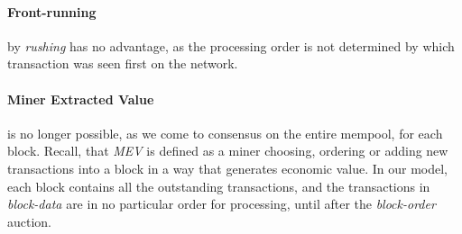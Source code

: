 \documentclass[12pt]{article}
\begin{document}
\paragraph*{Front-running} by \emph{rushing} has no advantage, as the processing order is not determined by which transaction was seen first on the network. 

\paragraph*{Miner Extracted Value} is no longer possible, as we come to consensus on the entire mempool, for each block. Recall, that \emph{MEV} is defined as a miner choosing, ordering or adding new transactions into a block in a way that generates economic value.  In our model, each block contains all the outstanding transactions, and the transactions in \emph{block-data} are in no particular order for processing, until after the \emph{block-order} auction. 

 
\newpage
{}

% 
\end{document}
